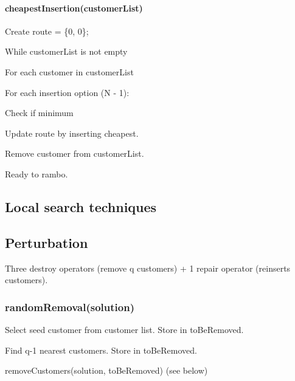 \paragraph*{cheapest\+Insertion(customer\+List)}


\begin{DoxyEnumerate}
\item Create {\ttfamily route = \{0, 0\};}
\item While customer\+List is not empty
\begin{DoxyItemize}
\item For each customer in customer\+List
\begin{DoxyItemize}
\item For each insertion option (N -\/ 1)\+:
\begin{DoxyItemize}
\item Check if minimum
\end{DoxyItemize}
\end{DoxyItemize}
\item Update route by inserting cheapest.
\item Remove customer from customer\+List.
\end{DoxyItemize}
\item Ready to rambo.
\end{DoxyEnumerate}

\subsection*{Local search techniques}

\subsection*{Perturbation}

Three destroy operators (remove q customers) + 1 repair operator (reinserts customers).

\subsubsection*{random\+Removal(solution)}


\begin{DoxyEnumerate}
\item Select seed customer from customer list. Store in to\+Be\+Removed.
\item Find q-\/1 nearest customers. Store in to\+Be\+Removed.
\item remove\+Customers(solution, to\+Be\+Removed) (see below)
\end{DoxyEnumerate}

